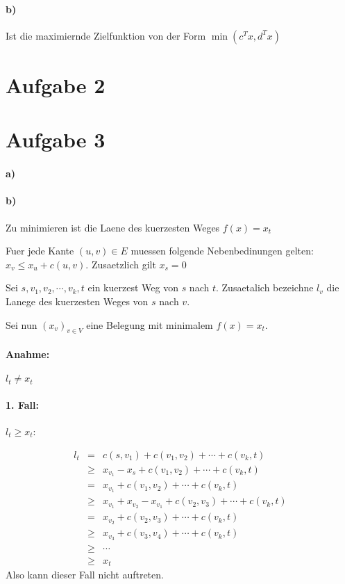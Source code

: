 \paragraph{b)}
Ist die maximiernde Zielfunktion von der Form $\min(c^T x, d^T x)$

\section*{Aufgabe 2}
\section*{Aufgabe 3}
\paragraph{a)}

\paragraph{b)}
Zu minimieren ist die Laene des kuerzesten Weges $f(x) = x_t$

Fuer jede Kante $(u,v) \in E$ muessen folgende Nebenbedinungen gelten:
$x_v \leq x_u + c(u,v)$. Zusaetzlich gilt $x_s = 0$

Sei $s, v_1, v_2, \cdots, v_k, t$ ein kuerzest Weg von $s$ nach $t$. Zusaetalich bezeichne
$l_v$ die Lanege des kuerzesten Weges von $s$ nach $v$.

Sei nun $(x_v)_{v\in V}$ eine Belegung mit minimalem $f(x) = x_t$.

\paragraph{Anahme:} $l_t \neq x_t$

\paragraph{1. Fall:} $l_t \geq x_t$:

\begin{eqnarray}
    l_t &=&         c(s,v_1) + c(v_1,v_2) + \cdots + c(v_k,t) \\
      &\geq& x_{v_1} - x_s + c(v_1,v_2) + \cdots + c(v_k,t) \\
      &=&    x_{v_1} + c(v_1,v_2) + \cdots + c(v_k,t) \\
      &\geq& x_{v_1} + x_{v_2} - x_{v_1} + c(v_2,v_3) + \cdots + c(v_k,t) \\
      &=&              x_{v_2}           + c(v_2,v_3) + \cdots + c(v_k,t) \\
      &\geq&           x_{v_3}           + c(v_3,v_4) + \cdots + c(v_k,t) \\
      &\geq& \cdots \\
      &\geq& x_t
\end{eqnarray}
Also kann dieser Fall nicht auftreten.

